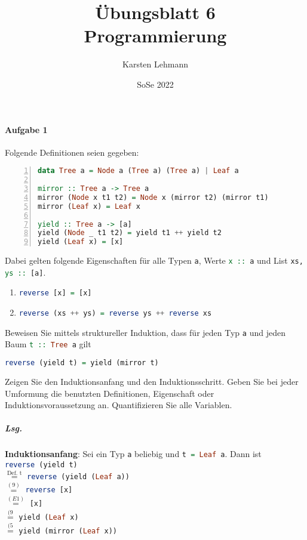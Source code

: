 \documentclass{scrreprt}
\author{Karsten Lehmann}
\date{SoSe 2022}
\title{Übungsblatt 6\\Programmierung}
\begin{document}
\paragraph{Aufgabe 1} Folgende Definitionen seien gegeben:
\begin{lstlisting}[language=Haskell, numbers=left]
data Tree a = Node a (Tree a) (Tree a) | Leaf a

mirror :: Tree a -> Tree a
mirror (Node x t1 t2) = Node x (mirror t2) (mirror t1)
mirror (Leaf x) = Leaf x

yield :: Tree a -> [a]
yield (Node _ t1 t2) = yield t1 ++ yield t2
yield (Leaf x) = [x]
\end{lstlisting}
Dabei gelten folgende Eigenschaften für alle Typen
\lstinline[language=Haskell]{a}, Werte
\lstinline[language=Haskell]{x :: a} und List
\lstinline[language=Haskell]{xs, ys :: [a]}.

\begin{enumerate}[label={(E\arabic*)}]
\item \lstinline[language=Haskell]{reverse [x] = [x]}
\item \lstinline[language=Haskell]{reverse (xs ++ ys) = reverse ys ++ reverse xs}
\end{enumerate}

Beweisen Sie mittels struktureller Induktion, dass für jeden Typ
\lstinline[language=Haskell]{a} und jeden Baum
\lstinline[language=Haskell]{t :: Tree a} gilt
\begin{lstlisting}[language=Haskell]
  reverse (yield t) = yield (mirror t)
\end{lstlisting}
Zeigen Sie den Induktionsanfang und den Induktionsschritt.
Geben Sie bei jeder Umformung die benutzten Definitionen, Eigenschaft oder
Induktionsvoraussetzung an.
Quantifizieren Sie alle Variablen.

\subparagraph{Lsg.} \textbf{Induktionsanfang}: Sei ein Typ
\lstinline[language=Haskell]{a} beliebig und
\lstinline[language=Haskell]{t = Leaf a}.
Dann ist\\
\lstinline[language=Haskell]{reverse (yield t)} \\
$\overset{\text{Def. t}}=$
\lstinline[language=Haskell]{reverse (yield (Leaf a))} \\
$\overset{(9)}=$
\lstinline[language=Haskell]{reverse [x]} \\
$\overset{(E1)}=$
\lstinline[language=Haskell]{[x]} \\
$\overset{(9}=$
\lstinline[language=Haskell]{yield (Leaf x)} \\
$\overset{(5}=$
\lstinline[language=Haskell]{yield (mirror (Leaf x))} \\
\end{document}
